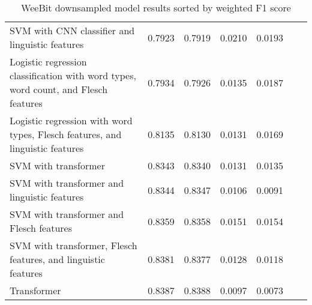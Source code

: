 \documentclass[11pt,a4paper]{article}
\theoremstyle{definition}
\begin{document}
\begin{table}[h]
{\begin{tabular}{p{7cm}p{1.5cm}p{1.5cm}p{1.5cm}p{1.5cm}p{1.5cm}p{1.5cm}}
SVM with CNN classifier and linguistic features & 0.7923 & 0.7919 & 0.0210 & 0.0193 \\
Logistic regression classification with word types, word count, and Flesch features & 0.7934 & 0.7926 & 0.0135 & 0.0187 \\
Logistic regression with word types, Flesch features, and linguistic features & 0.8135 & 0.8130 & 0.0131 & 0.0169 \\
SVM with transformer & 0.8343 & 0.8340 & 0.0131 & 0.0135 \\
SVM with transformer and linguistic features & 0.8344 & 0.8347 & 0.0106 & 0.0091 \\
SVM with transformer and Flesch features & 0.8359 & 0.8358 & 0.0151 & 0.0154 \\
SVM with transformer, Flesch features, and linguistic features & 0.8381 & 0.8377 & 0.0128 & 0.0118 \\
Transformer & 0.8387 & 0.8388 & 0.0097 & 0.0073 \\
\end{tabular}
} \caption{WeeBit downsampled model results sorted by weighted F1 score}
\end{table}
\end{document}
